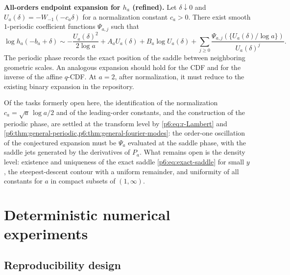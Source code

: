 \documentclass[11pt,oneside]{article}
\numberwithin{equation}{section}
\theoremstyle{definition}
\theoremstyle{remark}
\begin{document}
\begin{conjbox}
\textbf{All-orders endpoint expansion for $h_a$ (refined).}
Let $\delta\downarrow0$ and
$U_a(\delta)=-W_{-1}(-c_a\delta)$ for a normalization constant $c_a>0$.
There exist smooth $1$-periodic coefficient functions
$\Psi_{a,j}$ such that
\begin{equation}\label{p6:eq:endpoint-conjecture}
 \log h_a(-b_a+\delta)
 \sim-\frac{U_a(\delta)^2}{2\log a}
 +A_aU_a(\delta)+B_a\log U_a(\delta)
 +\sum_{j\ge0}\frac{
 \Psi_{a,j}(\{U_a(\delta)/\log a\})}
 {U_a(\delta)^j}.
\end{equation}
The periodic phase records the exact position of the saddle between neighboring
geometric scales.  An analogous expansion should hold for the CDF and for the
inverse of the affine $q$-CDF.  At $a=2$, after normalization, it must reduce to
the existing binary expansion in the repository.
\end{conjbox}

Of the tasks formerly open here, the identification of the normalization
$c_a=\sqrt a\,\log a/2$ and of the leading-order constants, and the construction
of the periodic phase, are settled at the transform level by
\eqref{p6:eq:r-Lambert} and
\cref{p6:thm:general-periodic,p6:thm:general-fourier-modes}: the order-one
oscillation of the conjectured expansion must be $\Psi_a$ evaluated at the
saddle phase, with the saddle jets generated by the derivatives of $P_a$.  What
remains open is the density level: existence and uniqueness of the exact saddle
\eqref{p6:eq:exact-saddle} for small $y$, the steepest-descent contour with a
uniform remainder, and uniformity of all constants for $a$ in compact subsets
of $(1,\infty)$.

\section{Deterministic numerical experiments}

\subsection{Reproducibility design}
\end{document}
